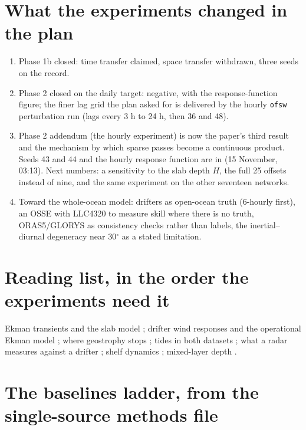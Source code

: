 \documentclass[11pt]{article}
\newcommand{\code}[1]{\texttt{#1}}
\begin{document}
\section{What the experiments changed in the plan}

\begin{enumerate}
  \item Phase 1b closed: time transfer claimed, space transfer withdrawn, three seeds on the record.
  \item Phase 2 closed on the daily target: negative, with the response-function figure; the finer lag grid the plan asked for is delivered by the hourly \code{ofsw} perturbation run (lags every 3 h to 24 h, then 36 and 48).
  \item Phase 2 addendum (the hourly experiment) is now the paper's third result and the mechanism by which sparse passes become a continuous product. Seeds 43 and 44 and the hourly response function are in (15 November, 03:13). Next numbers: a sensitivity to the slab depth $H$, the full 25 offsets instead of nine, and the same experiment on the other seventeen networks.
  \item Toward the whole-ocean model: drifters as open-ocean truth (6-hourly first), an OSSE with LLC4320 to measure skill where there is no truth, ORAS5/GLORYS as consistency checks rather than labels, the inertial--diurnal degeneracy near 30$^\circ$ as a stated limitation.
\end{enumerate}

\section{Reading list, in the order the experiments need it}

Ekman transients and the slab model \citep{pollard1970slab,pollard1973deepening,elipot2009ekman,alford2016nio}; drifter wind responses and the operational Ekman model \citep{elipot2016hourly,ubelmann2025wind,rio2014ekman}; where geostrophy stops \citep{torres2018partition,qiu2018transition,klein2019interactions}; tides in both datasets \citep{ray2016internaltides,zaron2019baroclinic,kachelein2024tides,pawlowicz2002ttide}; what a radar measures against a drifter \citep{stewart1974hfr,rohrs2015hfr,ardhuin2009stokes}; shelf dynamics \citep{lentz2012innershelf,brink1991ctw}; mixed-layer depth \citep{deboyer2004mld}.

\appendix
\section{The baselines ladder, from the single-source methods file}\label{app:ladder}
\begingroup\let\section\subsection

\endgroup


\end{document}
